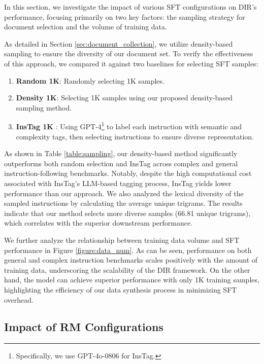 In this section, we investigate the impact of various SFT configurations on DIR's performance, focusing primarily on two key factors: the sampling strategy for document selection and the volume of training data.

As detailed in Section \ref{sec:document_collection}, we utilize density-based sampling to ensure the diversity of our document set. To verify the effectiveness of this approach, we compared it against two baselines for selecting SFT samples:

\begin{enumerate}[itemsep=1mm, parsep=0pt, leftmargin=*]
    \item \textbf{Random 1K}: Randomly selecting 1K samples.
    \item \textbf{Density 1K}: Selecting 1K samples using our proposed density-based sampling method.
    \item \textbf{InsTag 1K} \citep{Lu2023InsTagIT}: Using GPT-4\footnote{Specifically, we use GPT-4o-0806 for InsTag.} to label each instruction with semantic and complexity tags, then selecting instructions to ensure diverse representation.
\end{enumerate}

As shown in Table \ref{table:sampling}, our density-based method significantly outperforms both random selection and InsTag across complex and general instruction-following benchmarks. Notably, despite the high computational cost associated with InsTag's LLM-based tagging process, InsTag yields lower performance than our approach. We also analyzed the lexical diversity of the sampled instructions by calculating the average unique trigrams. The results indicate that our method selects more diverse samples (66.81 unique trigrams), which correlates with the superior downstream performance.

We further analyze the relationship between training data volume and SFT performance in Figure \ref{figure:data_num}. As can be seen, performance on both general and complex instruction benchmarks scales positively with the amount of training data, underscoring the scalability of the DIR framework. On the other hand, the model can achieve superior performance with only 1K training samples, highlighting the efficiency of our data synthesis process in minimizing SFT overhead.

\subsection{Impact of RM Configurations}

